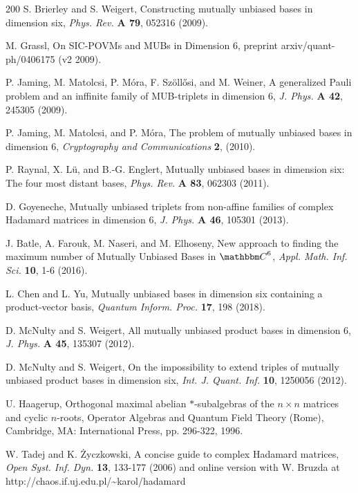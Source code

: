\documentclass[english,aps,pra,nofootinbib,twocolumn,superscriptaddress]{revtex4-1}
\newcommand{\1}{{\rm 1\hspace{-0.9mm}l}}
\begin{document}
\begin{thebibliography}{200}
 S. Brierley and S. Weigert,
Constructing mutually unbiased bases in dimension six,
{\sl Phys. Rev.} {\bf  A 79}, 052316 (2009).

 M. Grassl,
On SIC-POVMs and MUBs in Dimension $6$,
preprint arxiv/quant-ph/0406175 (v2 2009).

 P. Jaming, M. Matolcsi, P. M{\'o}ra,  F. Sz{\"o}ll{\H o}si,
  and M. Weiner, 
A generalized Pauli problem and an inffinite family of MUB-triplets in dimension $6$,
 {\sl J. Phys.} {\bf  A 42}, 245305 (2009).

  P. Jaming, M. Matolcsi, and P. M{\'o}ra,
The problem of mutually unbiased bases in dimension $6$,
{\sl Cryptography and Communications} {\bf 2}, (2010).
    
  P. Raynal, X. L{\"u}, and B.-G. Englert, 
 Mutually unbiased bases in dimension six: The four most distant bases,
{\sl Phys. Rev.} {\bf  A 83}, 062303 (2011). 

 D. Goyeneche,
Mutually unbiased triplets from non-affine families of 
complex Hadamard matrices in dimension $6$,
{\sl J. Phys.} {\bf A  46}, 105301  (2013).

 J. Batle, A. Farouk, M. Naseri, and M. Elhoseny,
New approach to finding the maximum number of
Mutually Unbiased Bases in ${\mathbbm C}^6$,
{\sl Appl. Math. Inf. Sci.} {\bf 10}, 1-6 (2016).

 L. Chen and L. Yu, 
Mutually unbiased bases in dimension six containing a product-vector basis,
{\sl  Quantum Inform. Proc.} {\bf 17}, 198 (2018). 

 D. McNulty and S. Weigert,
All mutually unbiased product bases in dimension $6$,
{\sl   J. Phys.} {\bf  A  45}, 135307 (2012).

 D. McNulty and S. Weigert,
 On the impossibility to extend triples of mutually unbiased product bases in dimension six,    
 {\sl Int. J. Quant. Inf.} {\bf  10}, 1250056 (2012). 

 U. Haagerup,
Orthogonal maximal abelian $*$-subalgebras of the $n \times n$ 
matrices and cyclic $n$-roots,
Operator Algebras and Quantum Field Theory (Rome),
Cambridge, MA: International Press, pp. 296-322, 1996.

 W. Tadej and  K. {\.Z}yczkowski,
A concise guide to complex Hadamard matrices, 
{\sl Open Syst. Inf. Dyn.} {\bf 13}, 133-177 (2006)
and online version with W. Bruzda at
http://chaos.if.uj.edu.pl/\~{}karol/hadamard
 

\end{thebibliography}
\end{document}
